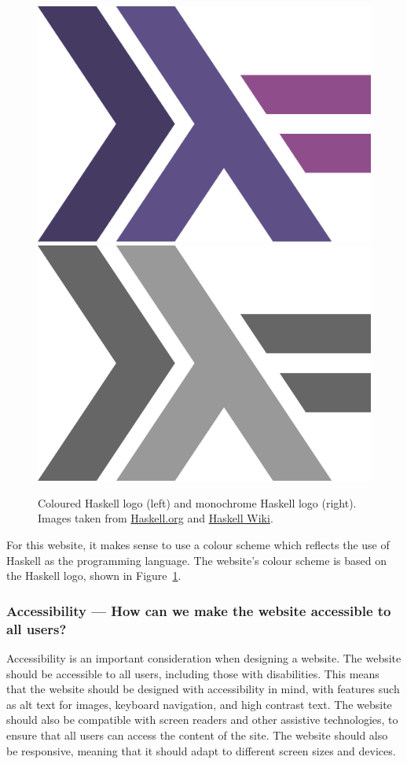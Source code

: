\documentclass[../main.tex]{subfiles}
\begin{document}
                \begin{figure}[H]
                    \centering
                    \includegraphics[width=0.45\linewidth]{images/haskell.png}
                    \includegraphics[width=0.45\linewidth]{images/haskellGrey.png}
                        \caption{Coloured Haskell logo (left) and monochrome Haskell logo (right).
                            Images taken from \href{https://www.haskell.org/}{Haskell.org} and
                                \href{https://wiki.haskell.org/Haskell_logos}{Haskell Wiki}.
                        }
                        \label{fig:haskell}
                \end{figure}

                For this website, it makes sense to use a colour scheme which reflects the use
                    of Haskell as the programming language.
                The website's colour scheme is based on the Haskell logo, shown in
                    Figure~\ref{fig:haskell}.

            \subsubsection{Accessibility — How can we make the website accessible to all users?}
                Accessibility is an important consideration when designing a website.
                The website should be accessible to all users, including those with
                    disabilities.
                This means that the website should be designed with accessibility in mind, with
                    features such as alt text for images, keyboard navigation, and high contrast
                    text.
                The website should also be compatible with screen readers and other assistive
                    technologies, to ensure that all users can access the content of the site.
                The website should also be responsive, meaning that it should adapt to
                    different screen sizes and devices.
\end{document}
